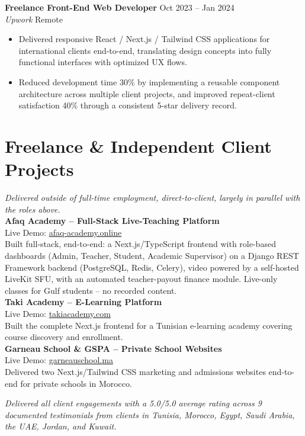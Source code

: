 \documentclass[10.5pt,letterpaper]{article}
\newcommand{\sectionrule}{\vspace{-1pt}{\color{hairline}\hrule height 0.6pt}\vspace{6pt}}
\newcommand{\entryHeading}[4]{%
  \textbf{#1} \hfill {\small\color{muted}#2}\\
  {\small\color{muted}\textit{#3}} \hfill {\small\color{muted}#4}\\[1pt]
}
\newcommand{\lineHeading}[2]{%
  \textbf{#1} \hfill {\small\color{muted}#2}\\[1pt]
}
\newcommand{\linkLine}[3]{{\small\color{muted}#1: }{\small\href{#2}{#3}}\\[2pt]}
\newcommand{\sectionNote}[1]{{\small\color{muted}\itshape#1}\\[3pt]}
\begin{document}
\entryHeading{Freelance Front-End Web Developer}{Oct 2023 -- Jan 2024}{Upwork}{Remote}
\begin{itemize}
    \item Delivered responsive React / Next.js / Tailwind CSS applications for international clients end-to-end,
    translating design concepts into fully functional interfaces with optimized UX flows.
    \item Reduced development time 30\% by implementing a reusable component architecture across multiple client
    projects, and improved repeat-client satisfaction 40\% through a consistent 5-star delivery record.
\end{itemize}

\section*{Freelance \& Independent Client Projects}
\sectionrule
\sectionNote{Delivered outside of full-time employment, direct-to-client, largely in parallel with the roles above.}

\lineHeading{Afaq Academy -- Full-Stack Live-Teaching Platform}{}
\linkLine{Live Demo}{https://afaq-academy.online/}{afaq-academy.online}
Built full-stack, end-to-end: a Next.js/TypeScript frontend with role-based dashboards (Admin, Teacher, Student,
Academic Supervisor) on a Django REST Framework backend (PostgreSQL, Redis, Celery), video powered by a
self-hosted LiveKit SFU, with an automated teacher-payout finance module. Live-only classes for Gulf students --
no recorded content.\\[4pt]

\lineHeading{Taki Academy -- E-Learning Platform}{}
\linkLine{Live Demo}{https://takiacademy.com/}{takiacademy.com}
Built the complete Next.js frontend for a Tunisian e-learning academy covering course discovery and enrollment.\\[4pt]

\lineHeading{Garneau School \& GSPA -- Private School Websites}{}
\linkLine{Live Demo}{https://www.garneauschool.ma/}{garneauschool.ma}
Delivered two Next.js/Tailwind CSS marketing and admissions websites end-to-end for private schools in Morocco.

\vspace{4pt}
\sectionNote{Delivered all client engagements with a 5.0/5.0 average rating across 9 documented testimonials from
clients in Tunisia, Morocco, Egypt, Saudi Arabia, the UAE, Jordan, and Kuwait.}
\end{document}
